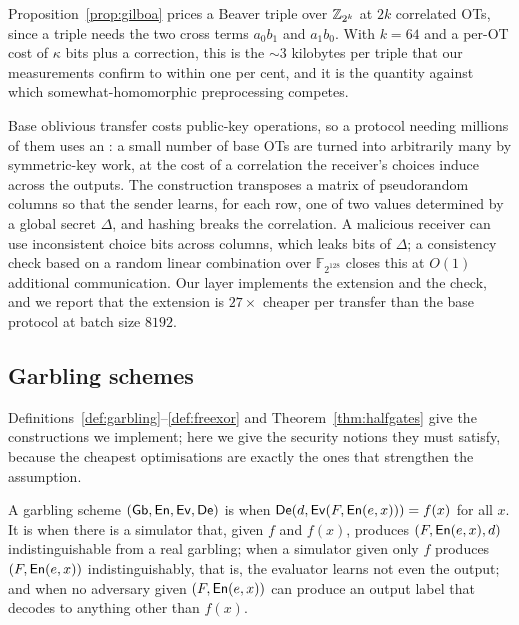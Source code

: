Proposition~\ref{prop:gilboa} prices a Beaver triple over $\mathbb{Z}_{2^k}$ at $2k$
correlated OTs, since a triple needs the two cross terms $a_0b_1$ and $a_1b_0$.
With $k=64$ and a per-OT cost of $\kappa$ bits plus a correction, this is the
$\sim\!3$ kilobytes per triple that our measurements confirm to within one per
cent, and it is the quantity against which somewhat-homomorphic preprocessing
competes.

\begin{remark}
\label{rem:iknp}
Base oblivious transfer costs public-key operations, so a protocol needing
millions of them uses an : a small number of base OTs are turned
into arbitrarily many by symmetric-key work, at the cost of a correlation the
receiver's choices induce across the outputs. The construction transposes a
matrix of pseudorandom columns so that the sender learns, for each row, one of
two values determined by a global secret $\Delta$, and hashing breaks the
correlation. A malicious receiver can use inconsistent choice bits across
columns, which leaks bits of $\Delta$; a consistency check based on a random
linear combination over $\mathbb{F}_{2^{128}}$ closes this at $O(1)$ additional
communication. Our layer implements the extension and the check, and we report
that the extension is $27\times$ cheaper per transfer than the base protocol at
batch size $8192$.
\end{remark}

\subsection{Garbling schemes}
\label{sec:found:gc}

Definitions~\ref{def:garbling}--\ref{def:freexor} and
Theorem~\ref{thm:halfgates} give the constructions we implement; here we give the
security notions they must satisfy, because the cheapest optimisations are
exactly the ones that strengthen the assumption.

\begin{definition}
\label{def:gc-security}
A garbling scheme $(\mathsf{Gb},\mathsf{En},\mathsf{Ev},\mathsf{De})$ is  when
$\mathsf{De}(d,\mathsf{Ev}(F,\mathsf{En}(e,x))) = f(x)$ for all $x$. It is  when there is a
simulator that, given $f$ and $f(x)$, produces $(F,\mathsf{En}(e,x),d)$ indistinguishable
from a real garbling;  when a simulator given only $f$ produces
$(F,\mathsf{En}(e,x))$ indistinguishably, that is, the evaluator learns not even the
output; and  when no adversary given $(F,\mathsf{En}(e,x))$ can produce an
output label that decodes to anything other than $f(x)$.
\end{definition}

